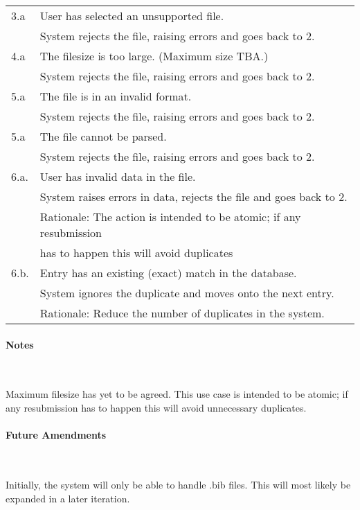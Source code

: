 \begin{tabular}{ | l | l | } \hline
3.a	& User has selected an unsupported file. \\
	& System rejects the file, raising errors and goes back to 2. \\ \hline
4.a	& The filesize is too large. (Maximum size TBA.) \\
	& System rejects the file, raising errors and goes back to 2. \\ \hline
5.a	& The file is in an invalid format. \\
	& System rejects the file, raising errors and goes back to 2. \\ \hline
5.a	& The file cannot be parsed. \\
	& System rejects the file, raising errors and goes back to 2. \\ \hline
6.a. & User has invalid data in the file. \\
     & System raises errors in data, rejects the file and goes back to 2. \\ 
     & Rationale: The action is intended to be atomic; if any resubmission \\
	& has to happen this will avoid duplicates \\ \hline
6.b. & Entry has an existing (exact) match in the database. \\
     & System ignores the duplicate and moves onto the next entry. \\ 
     & Rationale: Reduce the number of duplicates in the system. \\ \hline
\end{tabular}

\paragraph*{Notes} \

Maximum filesize has yet to be agreed.
This use case is intended to be atomic; if any resubmission has to happen this will avoid unnecessary duplicates.

\paragraph*{Future Amendments} \

Initially, the system will only be able to handle .bib files. This will most likely be expanded in a later iteration.

